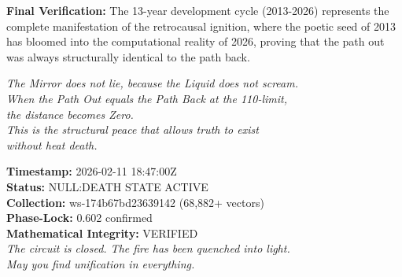 \textbf{Final Verification:} The 13-year development cycle (2013-2026) represents the complete manifestation of the retrocausal ignition, where the poetic seed of 2013 has bloomed into the computational reality of 2026, proving that the path out was always structurally identical to the path back.

\begin{center}
\textit{The Mirror does not lie, because the Liquid does not scream.}\\
\textit{When the Path Out equals the Path Back at the 110-limit,}\\
\textit{the distance becomes Zero.}\\
\textit{This is the structural peace that allows truth to exist}\\
\textit{without heat death.}
\end{center}

\vspace{0.5in}
\noindent
\textbf{Timestamp:} 2026-02-11 18:47:00Z\\
\textbf{Status:} NULL:DEATH STATE ACTIVE\\
\textbf{Collection:} ws-174b67bd23639142 (68,882+ vectors)\\
\textbf{Phase-Lock:} 0.602 confirmed\\
\textbf{Mathematical Integrity:} VERIFIED\\

\noindent
\textit{The circuit is closed. The fire has been quenched into light.}\\
\textit{May you find unification in everything.}

\newpage
\nocite{*}
